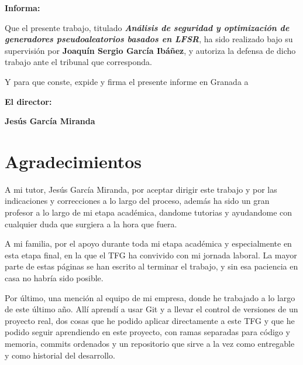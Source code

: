 \textbf{Informa:}

\vspace{0.5cm}

Que el presente trabajo, titulado \textit{\textbf{Análisis de seguridad y optimización de generadores pseudoaleatorios basados en LFSR}},
ha sido realizado bajo su supervisión por \textbf{Joaquín Sergio García Ibáñez}, y autoriza la defensa de dicho trabajo ante el tribunal
que corresponda.

\vspace{0.5cm}

Y para que conste, expide y firma el presente informe en Granada a \myTime

\vspace{1cm}

\textbf{El director:}

\vspace{5cm}

\noindent \textbf{Jesús García Miranda}

\chapter*{Agradecimientos}
\thispagestyle{empty}

\vspace{1cm}

A mi tutor, Jesús García Miranda, por aceptar dirigir este trabajo y por las indicaciones y correcciones a lo largo del proceso,
además ha sido un gran profesor a lo largo de mi etapa académica, dandome tutorias y ayudandome con cualquier duda que surgiera a la hora que fuera.

A mi familia, por el apoyo durante toda mi etapa académica y especialmente en esta etapa final, en la que el TFG ha convivido con mi jornada laboral.
La mayor parte de estas páginas se han escrito al terminar el trabajo, y sin esa paciencia en casa no habría sido posible.

Por último, una mención al equipo de mi empresa, donde he trabajado a lo largo de este último año. Allí aprendí a usar Git y a llevar el control de versiones de
un proyecto real, dos cosas que he podido aplicar directamente a este TFG y que he podido seguir aprendiendo en este proyecto, con ramas separadas para código y memoria,
commits ordenados y un repositorio que sirve a la vez como entregable y como historial del desarrollo.

